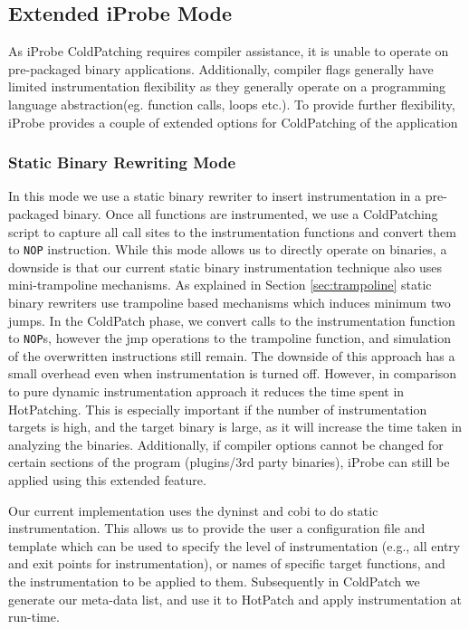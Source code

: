 \subsection{Extended iProbe Mode}
\label{sec:advanced}

As iProbe ColdPatching requires compiler assistance, it is unable to operate on pre-packaged binary applications.
Additionally, compiler flags generally have limited instrumentation flexibility as they generally operate on a programming language abstraction(eg. function calls, loops etc.).
To provide further flexibility, iProbe provides a couple of extended options for ColdPatching of the application

\subsubsection{Static Binary Rewriting Mode} 
 In this mode we use a static binary rewriter to insert instrumentation in a pre-packaged binary. 
Once all functions are instrumented, we use a ColdPatching script to capture all call sites to the instrumentation functions and convert them to \texttt{NOP} instruction.
While this mode allows us to directly operate on binaries, a downside is that our current static binary instrumentation technique also uses mini-trampoline mechanisms. 
As explained in Section \ref{sec:trampoline} static binary rewriters use trampoline based mechanisms which induces minimum two jumps.
In the ColdPatch phase, we convert calls to the instrumentation function to \texttt{NOP}s, however the jmp operations to the trampoline function, and simulation of the overwritten instructions still remain.
The downside of this approach has a small overhead even when instrumentation is turned off.
However, in comparison to pure dynamic instrumentation approach it reduces the time spent in HotPatching.
This is especially important if the number of instrumentation targets is high, and the target binary is large, as it will increase the time taken in analyzing the binaries. 
Additionally, if compiler options cannot be changed for certain sections of the program (plugins/3rd party binaries), iProbe can still be applied using this extended feature.

Our current implementation uses the dyninst \cite{dyninst} and cobi \cite{cobi} to do static instrumentation. 
This allows us to provide the user a configuration file and template which can be used to specify the level of instrumentation (e.g., all entry and exit points for instrumentation), or names of specific target functions, and the instrumentation to be applied to them.
Subsequently in ColdPatch we generate our meta-data list, and use it to HotPatch and apply instrumentation at run-time.

